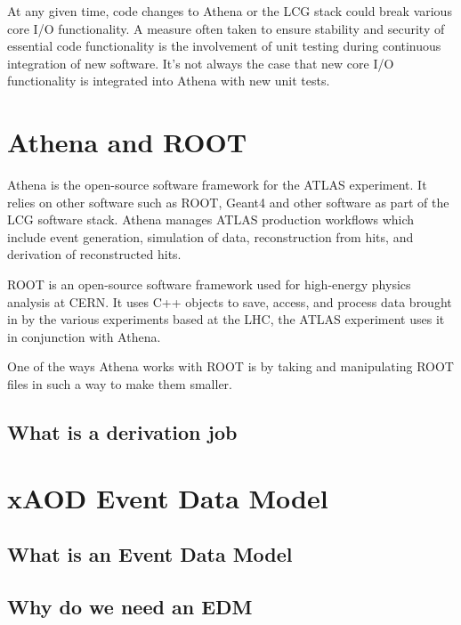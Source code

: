 At any given time, code changes to Athena or the LCG stack could break various core I/O functionality. \cite{atlascollaboration2024softwarecomputingrun3}
A measure often taken to ensure stability and security of essential code functionality is the involvement of unit testing during continuous integration of new software. \cite{athenadocs_CIbuild}
It's not always the case that new core I/O functionality is integrated into Athena with new unit tests. 

\section{Athena and ROOT}
Athena is the open-source software framework for the ATLAS experiment.\cite{athena}
It relies on other software such as ROOT, Geant4 and other software as part of the LCG software stack. 
Athena manages ATLAS production workflows which include event generation, simulation of data, reconstruction from hits, and derivation of reconstructed hits.\cite{athenadocs}


ROOT is an open-source software framework used for high-energy physics analysis at CERN.\cite{ROOT_about} 
It uses C++ objects to save, access, and process data brought in by the various experiments based at the LHC, the ATLAS experiment uses it in conjunction with Athena.


One of the ways Athena works with ROOT is by taking and manipulating ROOT files in such a way to make them smaller. 

\subsection{What is a derivation job}

\section{xAOD Event Data Model}
\subsection{What is an Event Data Model}
\subsection{Why do we need an EDM}

